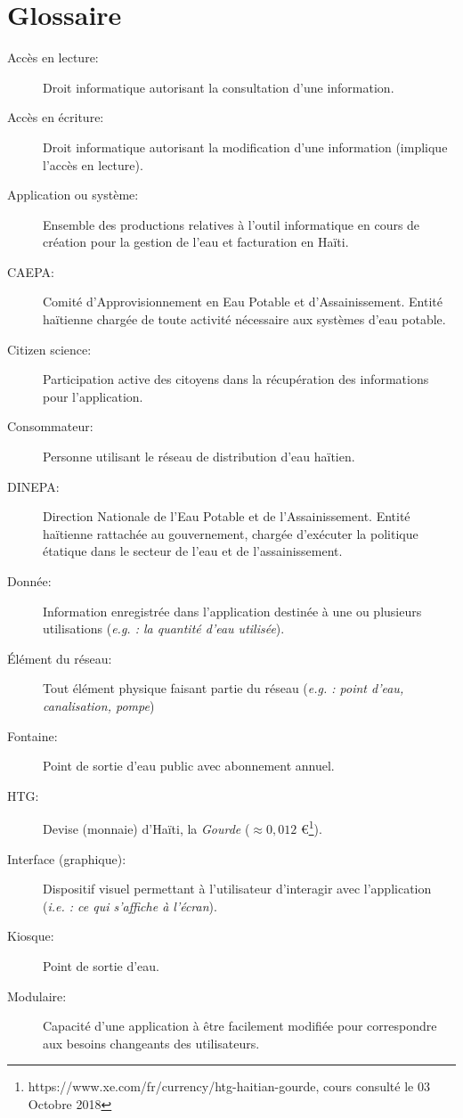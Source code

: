 \documentclass[a4paper, 11pt]{article}
\begin{document}
\section{Glossaire}
  \begin{description}
    \item[Accès en lecture:] Droit informatique autorisant la consultation d'une information.
    \item[Accès en écriture:] Droit informatique autorisant la modification d'une information (implique l'accès en lecture).
    \item[Application ou système:] Ensemble des productions relatives à l'outil informatique en cours de création pour la gestion de l'eau et facturation en Haïti.
    \item[CAEPA:] Comité d'Approvisionnement en Eau Potable et d'Assainissement. Entité haïtienne chargée de toute activité nécessaire aux systèmes d'eau potable.
    \item[Citizen science:] Participation active des citoyens dans la récupération des informations pour l'application.
    \item[Consommateur:] Personne utilisant le réseau de distribution d'eau haïtien.
    \item[DINEPA:] Direction Nationale de l'Eau Potable et de l'Assainissement. Entité haïtienne rattachée au gouvernement, chargée d'exécuter la politique étatique dans le secteur de l'eau et de l'assainissement.
    \item[Donnée:] Information enregistrée dans l'application destinée à une ou plusieurs utilisations (\emph{e.g. : la quantité d'eau utilisée}).
    \item[\'Elément du réseau:] Tout élément physique faisant partie du réseau (\emph{e.g. : point d'eau, canalisation, pompe})
    \item[Fontaine:] Point de sortie d'eau public avec abonnement annuel.
    \item[HTG:] Devise (monnaie) d'Haïti, la \emph{Gourde} ($\approx 0,012$ \euro \footnote{https://www.xe.com/fr/currency/htg-haitian-gourde, cours consulté le 03 Octobre 2018}).
    \item[Interface (graphique):] Dispositif visuel permettant à l'utilisateur d'interagir avec l'application (\emph{i.e. : ce qui s'affiche à l'écran}).
    \item[Kiosque:] Point de sortie d'eau. %
    \item[Modulaire:] Capacité d'une application à être facilement modifiée pour correspondre aux besoins changeants des utilisateurs.

\end{description}
\end{document}
